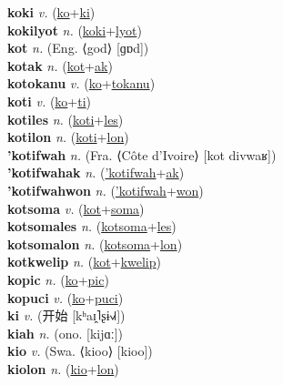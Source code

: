 \textbf{koki} \textit{v.} (\hyperref[ko]{ko}+\hyperref[ki]{ki})
 \label{koki} \\
\textbf{kokilyot} \textit{n.} (\hyperref[koki]{koki}+\hyperref[lyot]{lyot})
 \label{kokilyot} \\
\textbf{kot} \textit{n.} (Eng. ⟨god⟩ [ɡɒd])
 \label{kot} \\
\textbf{kotak} \textit{n.} (\hyperref[kot]{kot}+\hyperref[ak]{ak})
 \label{kotak} \\
\textbf{kotokanu} \textit{v.} (\hyperref[ko]{ko}+\hyperref[tokanu]{tokanu})
 \label{kotokanu} \\
\textbf{koti} \textit{v.} (\hyperref[ko]{ko}+\hyperref[ti]{ti})
 \label{koti} \\
\textbf{kotiles} \textit{n.} (\hyperref[koti]{koti}+\hyperref[les]{les})
 \label{kotiles} \\
\textbf{kotilon} \textit{n.} (\hyperref[koti]{koti}+\hyperref[lon]{lon})
 \label{kotilon} \\
\textbf{'kotifwah} \textit{n.} (Fra. ⟨Côte d’Ivoire⟩ [kot divwaʁ])
 \label{'kotifwah} \\
\textbf{'kotifwahak} \textit{n.} (\hyperref['kotifwah]{'kotifwah}+\hyperref[ak]{ak})
 \label{'kotifwahak} \\
\textbf{'kotifwahwon} \textit{n.} (\hyperref['kotifwah]{'kotifwah}+\hyperref[won]{won})
 \label{'kotifwahwon} \\
\textbf{kotsoma} \textit{v.} (\hyperref[kot]{kot}+\hyperref[soma]{soma})
 \label{kotsoma} \\
\textbf{kotsomales} \textit{n.} (\hyperref[kotsoma]{kotsoma}+\hyperref[les]{les})
 \label{kotsomales} \\
\textbf{kotsomalon} \textit{n.} (\hyperref[kotsoma]{kotsoma}+\hyperref[lon]{lon})
 \label{kotsomalon} \\
\textbf{kotkwelip} \textit{n.} (\hyperref[kot]{kot}+\hyperref[kwelip]{kwelip})
 \label{kotkwelip} \\
\textbf{kopic} \textit{n.} (\hyperref[ko]{ko}+\hyperref[pic]{pic})
 \label{kopic} \\
\textbf{kopuci} \textit{v.} (\hyperref[ko]{ko}+\hyperref[puci]{puci})
 \label{kopuci} \\
\textbf{ki} \textit{v.} ({\chinese{}开始} [kʰaɪ̯˥ʂɨ˧˩˧])
 \label{ki} \\
\textbf{kiah} \textit{n.} (ono. [kijɑː])
 \label{kiah} \\
\textbf{kio} \textit{v.} (Swa. ⟨kioo⟩ [kioo])
 \label{kio} \\
\textbf{kiolon} \textit{n.} (\hyperref[kio]{kio}+\hyperref[lon]{lon})
